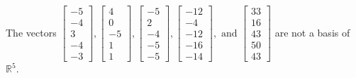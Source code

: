 \begin{exercise}
\begin{exerciseStatement}
  \end{exerciseStatement}
  \begin{exerciseAnswer}
   The vectors \(\left[\begin{array}{r}
-5 \\
-4 \\
3 \\
-4 \\
-3
\end{array}\right] , \left[\begin{array}{r}
4 \\
0 \\
-5 \\
1 \\
1
\end{array}\right] , \left[\begin{array}{r}
-5 \\
2 \\
-4 \\
-5 \\
-5
\end{array}\right] , \left[\begin{array}{r}
-12 \\
-4 \\
-12 \\
-16 \\
-14
\end{array}\right] , \text{ and } \left[\begin{array}{r}
33 \\
16 \\
43 \\
50 \\
43
\end{array}\right]\) 
  	 are not  a basis of \(\mathbb{R}^5\).
  


  \end{exerciseAnswer}
\end{exercise}